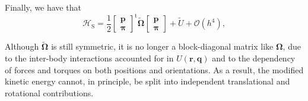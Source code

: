 \documentclass[
journal=jctcce,
layout=twocolumn
]{achemso}
\newcommand{\mt}[1]{\boldsymbol{\mathbf{#1}}}   %
\newcommand{\vt}[1]{\boldsymbol{\mathbf{#1}}}   %
\newcommand{\tr}[1]{#1^\text{t}}                %
\newcommand{\Ham}[1]{{\mathcal H}_\text{#1}}    %
\newcommand{\timestep}{h}
\newcommand{\refined}[1]{\widetilde{#1}}
\begin{document}
Finally, we have that
\begin{equation*}
\Ham S = \frac{1}{2} \tr{\left[\begin{array}{c} \vt p \\ \vt \pi \end{array}\right]} \tilde{\mt \Omega} \left[\begin{array}{c} \vt p \\ \vt \pi \end{array}\right] + \tilde{U} + \mathcal{O}({\timestep}^4),
\end{equation*}

Although $\refined{\mathbf \Omega}$ is still symmetric, it is no longer a block-diagonal matrix like $\mt \Omega$, due to the inter-body interactions accounted for in $U(\vt r, \vt q)$ and to the dependency of forces and torques on both positions and orientations.
As a result, the modified kinetic energy cannot, in principle, be split into independent translational and rotational contributions.

\suppinfo


\end{document}

